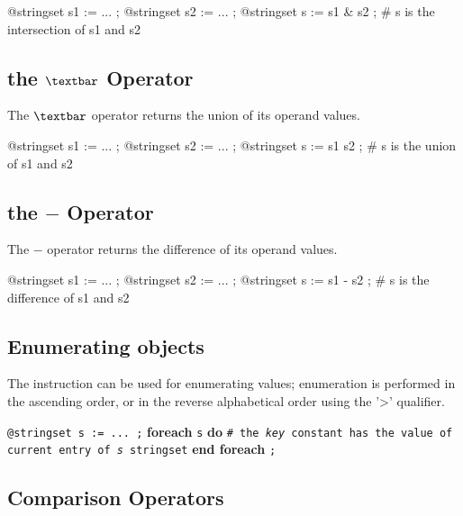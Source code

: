 \exempleTroisLignes
{}
{@stringset s1 := ... ;}
{@stringset s2 := ... ;}
{@stringset s := s1 \& s2 ; \# s is the intersection of s1 and s2}






\subsection{the \emph{$\textbar$} Operator}

The \emph{$\textbar$} operator returns the union of its operand values.

\exempleTroisLignes
{}
{@stringset s1 := ... ;}
{@stringset s2 := ... ;}
{@stringset s := s1 \textbar s2 ; \# s is the union of s1 and s2}






\subsection{the \emph{$-$} Operator}

The \emph{$-$} operator returns the difference of its operand values.

\exempleTroisLignes
{}
{@stringset s1 := ... ;}
{@stringset s2 := ... ;}
{@stringset s := s1 - s2 ; \# s is the difference of s1 and s2}








\subsection{Enumerating  objects}


The  instruction can be used for enumerating  values; enumeration is performed in the ascending order, or in the reverse alphabetical order using the '>' qualifier.

\texttt{@stringset s := ... ;}\newline
\textbf{foreach} \texttt {s} \textbf {do}\newline
\texttt{\# the \emph{key} constant has the value of current entry of \emph{s} stringset}\newline
\textbf{end foreach} \texttt{;}







\subsection{Comparison Operators}

